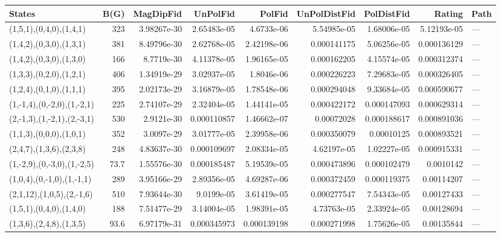 \begin{tabular}{lrrrrrrrl}
\hline
 States                      &   B(G) &   MagDipFid &    UnPolFid &      PolFid &   UnPolDistFid &   PolDistFid &      Rating & Path   \\
\hline
 (1,5,1),(0,4,0),(1,4,1)     &  323   & 3.98267e-30 & 2.65483e-05 & 4.6733e-06  &    5.54985e-05 &  1.68006e-05 & 5.12193e-05 & ---    \\
 (1,4,2),(0,3,0),(1,3,1)     &  381   & 8.49796e-30 & 2.62768e-05 & 2.42198e-06 &    0.000141175 &  5.06256e-05 & 0.000136129 & ---    \\
 (1,4,2),(0,3,0),(1,3,0)     &  166   & 8.7719e-30  & 4.11378e-05 & 1.96165e-05 &    0.000162205 &  4.15574e-05 & 0.000312374 & ---    \\
 (1,3,3),(0,2,0),(1,2,1)     &  406   & 1.34919e-29 & 3.02937e-05 & 1.8046e-06  &    0.000226223 &  7.29683e-05 & 0.000326405 & ---    \\
 (1,2,4),(0,1,0),(1,1,1)     &  395   & 2.02173e-29 & 3.16879e-05 & 1.78548e-06 &    0.000294048 &  9.33684e-05 & 0.000590677 & ---    \\
 (1,-1,4),(0,-2,0),(1,-2,1)  &  225   & 2.74107e-29 & 2.32404e-05 & 1.44141e-05 &    0.000422172 &  0.000147093 & 0.000629314 & ---    \\
 (2,-1,3),(1,-2,1),(2,-3,1)  &  530   & 2.9121e-30  & 0.000110857 & 1.46662e-07 &    0.00072028  &  0.000188617 & 0.000891036 & ---    \\
 (1,1,3),(0,0,0),(1,0,1)     &  352   & 3.0097e-29  & 3.01777e-05 & 2.39958e-06 &    0.000350079 &  0.00010125  & 0.000893521 & ---    \\
 (2,4,7),(1,3,6),(2,3,8)     &  248   & 4.83637e-30 & 0.000109697 & 2.08334e-05 &    4.62197e-05 &  1.02227e-05 & 0.000915331 & ---    \\
 (1,-2,9),(0,-3,0),(1,-2,5)  &   73.7 & 1.55576e-30 & 0.000185487 & 5.19539e-05 &    0.000473896 &  0.000102479 & 0.0010142   & ---    \\
 (1,0,4),(0,-1,0),(1,-1,1)   &  289   & 3.95166e-29 & 2.89356e-05 & 4.69287e-06 &    0.000372459 &  0.000119375 & 0.00114207  & ---    \\
 (2,1,12),(1,0,5),(2,-1,6)   &  510   & 7.93644e-30 & 9.0199e-05  & 3.61419e-05 &    0.000277547 &  7.54343e-05 & 0.00127433  & ---    \\
 (1,5,1),(0,4,0),(1,4,0)     &  188   & 7.51477e-29 & 3.14004e-05 & 1.98391e-05 &    4.73763e-05 &  2.33924e-05 & 0.00128694  & ---    \\
 (1,3,6),(2,4,8),(1,3,5)     &   93.6 & 6.97179e-31 & 0.000345973 & 0.000139198 &    0.000271998 &  1.75626e-05 & 0.00135844  & ---    \\

\end{tabular}
